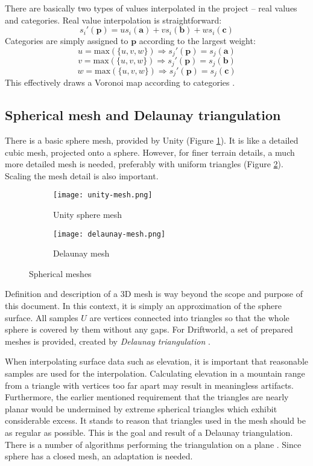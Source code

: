 There are basically two types of values interpolated in the project -- real values and categories. Real value interpolation is straightforward:
$$s_i'(\mathbf{p})=us_i(\mathbf{a})+vs_i(\mathbf{b})+ws_i(\mathbf{c})$$
Categories are simply assigned to $\mathbf{p}$ according to the largest weight:
$$u=\mbox{max}(\{u,v,w\})\Rightarrow s_j'(\mathbf{p})=s_j(\mathbf{a})$$
$$v=\mbox{max}(\{u,v,w\})\Rightarrow s_j'(\mathbf{p})=s_j(\mathbf{b})$$
$$w=\mbox{max}(\{u,v,w\})\Rightarrow s_j'(\mathbf{p})=s_j(\mathbf{c})$$
This effectively draws a Voronoi map according to categories \cite{voronoi}.
\subsection{Spherical mesh and Delaunay triangulation}
There is a basic sphere mesh, provided by Unity (Figure \ref{fig:unity-mesh}). It is like a detailed cubic mesh, projected onto a sphere. However, for finer terrain details, a much more detailed mesh is needed, preferably with uniform triangles (Figure \ref{fig:delaunay-mesh}). Scaling the mesh detail is also important.

\begin{figure}[ht]
\centering
\begin{subfigure}{7cm}
\texttt{[image: unity-mesh.png]}
\caption{Unity sphere mesh}
\label{fig:unity-mesh}
\end{subfigure}
\hspace*{1cm}
\begin{subfigure}{7cm}
\texttt{[image: delaunay-mesh.png]}
\caption{Delaunay mesh}
\label{fig:delaunay-mesh}
\end{subfigure}
\caption{Spherical meshes}
\label{fig:spherical-mesh}
\end{figure}
Definition and description of a 3D mesh is way beyond the scope and purpose of this document. In this context, it is simply an approximation of the sphere surface. All samples $U$ are vertices connected into triangles so that the whole sphere is covered by them without any gaps. For Driftworld, a set of prepared meshes is provided, created by \textit{Delaunay triangulation} \cite{delaunay}.

When interpolating surface data such as elevation, it is important that reasonable samples are used for the interpolation. Calculating elevation in a mountain range from a triangle with vertices too far apart may result in meaningless artifacts. Furthermore, the earlier mentioned requirement that the triangles are nearly planar would be undermined by extreme spherical triangles which exhibit considerable excess. It stands to reason that triangles used in the mesh should be as regular as possible. This is the goal and result of a Delaunay triangulation. There is a number of algorithms performing the triangulation on a plane \cite{knuth}. Since sphere has a closed mesh, an adaptation is needed.

